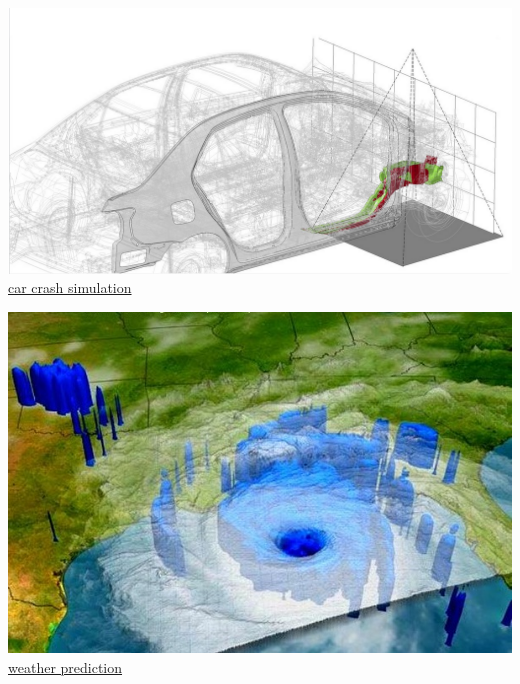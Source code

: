 \begin{frame}[c]
\begin{minipage}[t]{0.25\textwidth}
	\end{minipage}
	\begin{minipage}[t]{0.25\textwidth}\centering
		\includegraphics[width=\textwidth]{media/carcrash_sim.png}\\
		\hyperref{https://www.emi.fraunhofer.de/de/geschaeftsfelder/automotive/forschung/archiv/Roentgen-Crashtest.html}{}{}{car crash simulation} 
	\end{minipage}
	\begin{minipage}[t]{0.25\textwidth}\centering
		\includegraphics[width=\textwidth]{media/weather.jpg}\\
		\hyperref{https://en.wikipedia.org/wiki/Numerical_weather_prediction}{}{}{weather prediction} 
	\end{minipage}
	\begin{minipage}[t]{0.25\textwidth} \centering

\end{minipage}
\end{frame}
